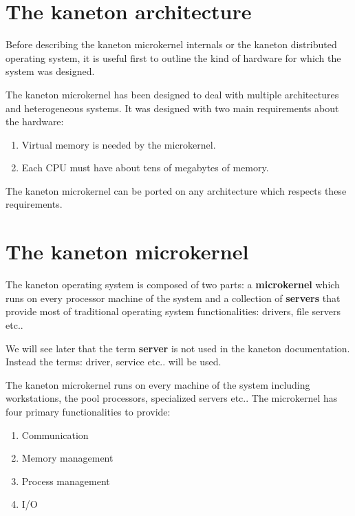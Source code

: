 \begin{multicols}{2}
\section{The kaneton architecture}

Before describing the kaneton microkernel internals or the kaneton distributed
operating system, it is useful first to outline the kind of hardware for
which the system was designed.

The kaneton microkernel has been designed to deal with multiple architectures
and heterogeneous systems. It was designed with two main requirements about the
hardware:

\begin{enumerate}

\item Virtual memory is needed by the microkernel.
\item Each CPU must have about tens of megabytes of memory.

\end{enumerate}

The kaneton microkernel can be ported on any architecture which respects these
requirements.



\section{The kaneton microkernel}

The kaneton operating system is composed of two parts: a \textbf{microkernel}
which runs on every processor machine of the system and a collection of
\textbf{servers} that provide most of traditional operating system
functionalities: drivers, file servers etc..

We will see later that the term \textbf{server} is not used in the kaneton
documentation. Instead the terms: driver, service etc.. will be used.

The kaneton microkernel runs on every machine of the system including
workstations, the pool processors, specialized servers etc.. The microkernel
has four primary functionalities to provide:

\begin{enumerate}

\item Communication
\item Memory management
\item Process management
\item I/O


\end{enumerate}
\end{multicols}
